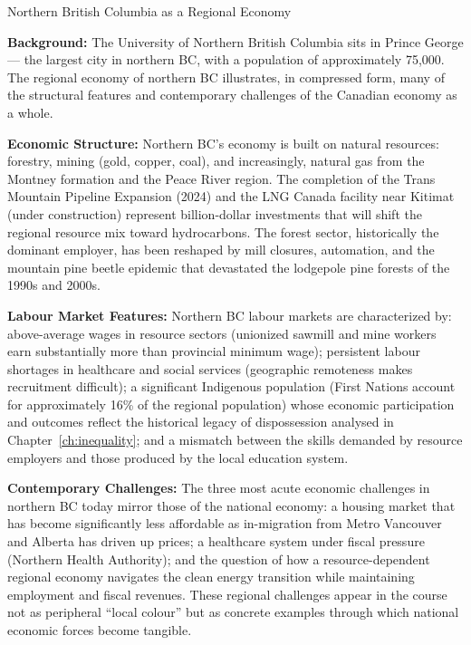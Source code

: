 \begin{casestudy}{Northern British Columbia as a Regional Economy}

\textbf{Background:} The University of Northern British Columbia sits in
Prince George --- the largest city in northern BC, with a population of
approximately 75,000. The regional economy of northern BC illustrates,
in compressed form, many of the structural features and contemporary
challenges of the Canadian economy as a whole.

\textbf{Economic Structure:} Northern BC's economy is built on natural
resources: forestry, mining (gold, copper, coal), and increasingly, natural
gas from the Montney formation and the Peace River region. The completion
of the Trans Mountain Pipeline Expansion (2024) and the LNG Canada facility
near Kitimat (under construction) represent billion-dollar investments that
will shift the regional resource mix toward hydrocarbons. The forest sector,
historically the dominant employer, has been reshaped by mill closures,
automation, and the mountain pine beetle epidemic that devastated the lodgepole
pine forests of the 1990s and 2000s.

\textbf{Labour Market Features:} Northern BC labour markets are characterized
by: above-average wages in resource sectors (unionized sawmill and mine
workers earn substantially more than provincial minimum wage); persistent
labour shortages in healthcare and social services (geographic remoteness
makes recruitment difficult); a significant Indigenous population (First
Nations account for approximately 16\% of the regional population) whose
economic participation and outcomes reflect the historical legacy of
dispossession analysed in Chapter~\ref{ch:inequality}; and a mismatch
between the skills demanded by resource employers and those produced by
the local education system.

\textbf{Contemporary Challenges:} The three most acute economic challenges
in northern BC today mirror those of the national economy: a housing market
that has become significantly less affordable as in-migration from
Metro Vancouver and Alberta has driven up prices; a healthcare system
under fiscal pressure (Northern Health Authority); and the question of
how a resource-dependent regional economy navigates the clean energy
transition while maintaining employment and fiscal revenues. These regional
challenges appear in the course not as peripheral ``local colour'' but as
concrete examples through which national economic forces become tangible.
\end{casestudy}

